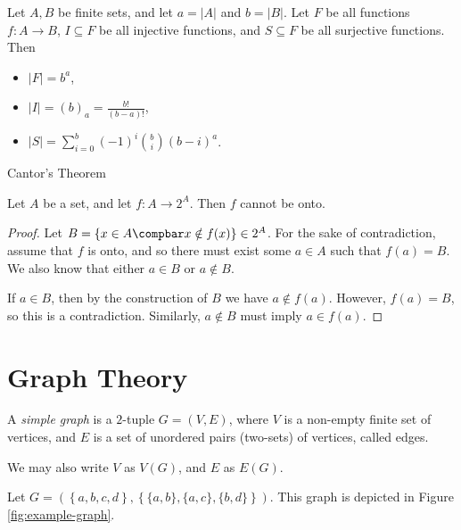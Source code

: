 \documentclass[12pt]{article}
\begin{document}
\begin{prop}
    Let $A, B$ be finite sets, and let $a = |A|$ and $b = |B|$. Let $F$ be all functions $f: A \to B$, $I \subseteq F$ be all injective functions, and $S \subseteq F$ be all surjective functions. Then
    \begin{itemize}
        \item $|F| = b^a$,
        \item $|I| = (b)_a = \frac{b!}{(b-a)!}$,
        \item $|S| = \sum_{i=0}^b(-1)^i\binom{b}{i}(b-i)^a$.
    \end{itemize}
\end{prop}

\begin{thm}
    Cantor's Theorem

    Let $A$ be a set, and let $f: A \to 2^A$. Then $f$ cannot be onto.
\end{thm}

\begin{proof}
    Let $B = \left\{x \in A \compbar x \notin f(x) \right\} \in 2^A$. For the sake of contradiction, assume that $f$ is onto, and so there must exist some $a \in A$ such that $f(a) = B$. We also know that either $a \in B$ or $a \notin B$.

    If $a \in B$, then by the construction of $B$ we have $a \notin f(a)$. However, $f(a) = B$, so this is a contradiction. Similarly, $a \notin B$ must imply $a \in f(a)$.
\end{proof}

\section{Graph Theory}

\begin{defn}
    A \emph{simple graph} is a $2$-tuple $G = (V, E)$, where $V$ is a non-empty finite set of vertices, and $E$ is a set of unordered pairs (two-sets) of vertices, called edges.
\end{defn}

\begin{rmk}
    We may also write $V$ as $V(G)$, and $E$ as $E(G)$.
\end{rmk}

\begin{exmp} Let $G = \left(\left\{a, b, c, d\right\}, \left\{\{a, b\}, \{a, c\}, \{b, d\}\right\}\right)$. This graph is depicted in Figure \ref{fig:example-graph}.
\end{exmp}
\end{document}

